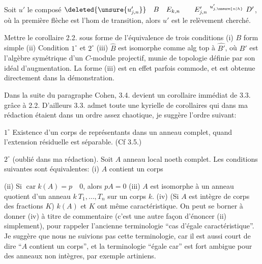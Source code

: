 Soit $u'$ le composé $\deleted{\unsure{u'_{j,n}}}\quad B\quad E_{k,n}\qquad E'_{j,n}\ {\vphantom{E'}}^{u'_{j,\unsure{n|h}}}\ D'$, où la première flèche est l'hom de transition, alors $u'$ est le relèvement cherché.

Mettre le corollaire 2.2. sous forme de l'équivalence de trois conditions (i) $B$ form simple (ii) Condition $1^\circ$ et $2^\circ$ (iii) $\widehat B$ est isomorphe comme alg top à $\widehat {B'}$, où $B'$ est l'algèbre symétrique d'un $C$-module projectif, munie de  topologie définie par son idéal d'augmentation. La forme (iii) est en effet parfois commode, et est obtenue directement dans la démonstration.

Dans la suite du paragraphe Cohen, 3.4. devient un corollaire immédiat de 3.3. grâce à 2.2. D'ailleurs 3.3. admet toute une kyrielle de corollaires qui dans ma rédaction étaient dans un ordre assez chaotique, je suggère  l'ordre suivant:

$1^\circ$ Existence d'un corps de représentants dans un anneau  complet, quand l'extension résiduelle est séparable. (Cf 3.5.)

$2^\circ$ (oublié dans ma rédaction). Soit $A$ anneau local noeth complet. Les conditions suivantes sont équivalentes: (i) $A$ contient un corps

(ii) Si $\operatorname{car}k(A)=p\quad0$, alors $pA=0$ (iii) $A$ est isomorphe à un anneau quotient d'un anneau $k\ T_1,\ldots,T_n$ sur un corps $k$. (iv) (Si $A$ est intègre de corps des fractions $K$) $k(A)$ et $K$ ont même caractéristique. On peut se borner à donner (iv) à titre de commentaire (c'est une autre façon d'énoncer (ii) simplement), pour  rappeler l'ancienne terminologie ``cas d'égale caractéristique''. Je suggère que nous ne suivions pas cette terminologie, car il est aussi court de dire ``$A$ contient un corps'', et la terminologie ``égale car'' est fort ambigue pour des anneaux non intègres, par exemple artiniens.

